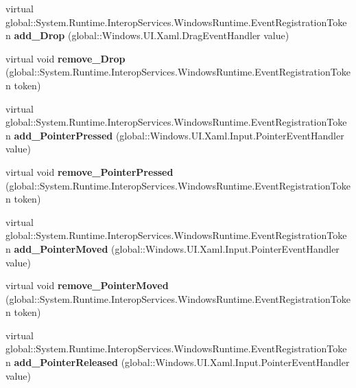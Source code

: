 \begin{DoxyCompactItemize}
virtual global\+::\+System.\+Runtime.\+Interop\+Services.\+Windows\+Runtime.\+Event\+Registration\+Token {\bfseries add\+\_\+\+Drop} (global\+::\+Windows.\+U\+I.\+Xaml.\+Drag\+Event\+Handler value)
\item 
\mbox{\label{class_windows_1_1_u_i_1_1_xaml_1_1_u_i_element_ac2b3602dc7f654559858450b171f9b01}} 
virtual void {\bfseries remove\+\_\+\+Drop} (global\+::\+System.\+Runtime.\+Interop\+Services.\+Windows\+Runtime.\+Event\+Registration\+Token token)
\item 
\mbox{\label{class_windows_1_1_u_i_1_1_xaml_1_1_u_i_element_a06d0eec496772934d5bfec139854c34c}} 
virtual global\+::\+System.\+Runtime.\+Interop\+Services.\+Windows\+Runtime.\+Event\+Registration\+Token {\bfseries add\+\_\+\+Pointer\+Pressed} (global\+::\+Windows.\+U\+I.\+Xaml.\+Input.\+Pointer\+Event\+Handler value)
\item 
\mbox{\label{class_windows_1_1_u_i_1_1_xaml_1_1_u_i_element_a4e21b0597f1640b1294e0dc5d330e6ca}} 
virtual void {\bfseries remove\+\_\+\+Pointer\+Pressed} (global\+::\+System.\+Runtime.\+Interop\+Services.\+Windows\+Runtime.\+Event\+Registration\+Token token)
\item 
\mbox{\label{class_windows_1_1_u_i_1_1_xaml_1_1_u_i_element_a35fdbc426595a77556b9e7587b4c8f8e}} 
virtual global\+::\+System.\+Runtime.\+Interop\+Services.\+Windows\+Runtime.\+Event\+Registration\+Token {\bfseries add\+\_\+\+Pointer\+Moved} (global\+::\+Windows.\+U\+I.\+Xaml.\+Input.\+Pointer\+Event\+Handler value)
\item 
\mbox{\label{class_windows_1_1_u_i_1_1_xaml_1_1_u_i_element_a63a39b75c65106c0b053b29fc0637f66}} 
virtual void {\bfseries remove\+\_\+\+Pointer\+Moved} (global\+::\+System.\+Runtime.\+Interop\+Services.\+Windows\+Runtime.\+Event\+Registration\+Token token)
\item 
\mbox{\label{class_windows_1_1_u_i_1_1_xaml_1_1_u_i_element_ac262b01e4394eafebb2fc7c72a05c364}} 
virtual global\+::\+System.\+Runtime.\+Interop\+Services.\+Windows\+Runtime.\+Event\+Registration\+Token {\bfseries add\+\_\+\+Pointer\+Released} (global\+::\+Windows.\+U\+I.\+Xaml.\+Input.\+Pointer\+Event\+Handler value)

\end{DoxyCompactItemize}
